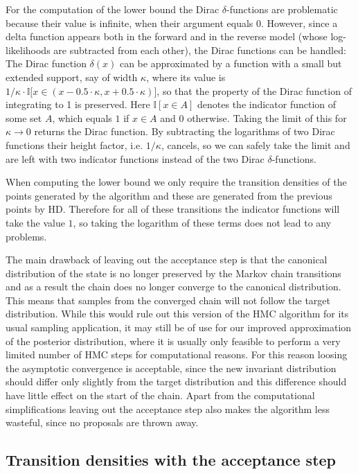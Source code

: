 For the computation of the lower bound the Dirac $\delta$-functions are problematic because their value is infinite, when their argument equals $0$. However, since a delta function appears both in the forward and in the reverse model (whose log-likelihoods are subtracted from each other), the Dirac functions can be handled: The Dirac function $\delta(x)$ can be approximated by a function with a small but extended support, say of width $\kappa$, where its value is $1/\kappa \cdot \mathbb{I}\big[x \in (x - 0.5 \cdot \kappa, x + 0.5 \cdot \kappa)\big]$, so that the property of the Dirac function of integrating to 1 is preserved. Here $\mathbb{I}[x \in A]$ denotes the indicator function of some set $A$, which equals $1$ if $x \in A$ and $0$ otherwise. Taking the limit of this for $\kappa \rightarrow 0$ returns the Dirac function. By subtracting the logarithms of two Dirac functions their height factor, i.e. $1/\kappa$, cancels, so we can safely take the limit and are left with two indicator functions instead of the two Dirac $\delta$-functions.

When computing the lower bound we only require the transition densities of the points generated by the algorithm and these are generated from the previous points by HD. Therefore for all of these transitions the indicator functions will take the value $1$, so taking the logarithm of these terms does not lead to any problems.

The main drawback of leaving out the acceptance step is that the canonical distribution of the state is no longer preserved by the Markov chain transitions and as a result the chain does no longer converge to the canonical distribution. This means that samples from the converged chain will not follow the target distribution. While this would rule out this version of the HMC algorithm for its usual sampling application, it may still be of use for our improved approximation of the posterior distribution, where it is usually only feasible to perform a very limited number of HMC steps for computational reasons. For this reason loosing the asymptotic convergence is acceptable, since the new invariant distribution should differ only slightly from the target distribution and this difference should have little effect on the start of the chain. Apart from the computational simplifications leaving out the acceptance step also makes the algorithm less wasteful, since no proposals are thrown away.

\subsection{Transition densities with the acceptance step}

